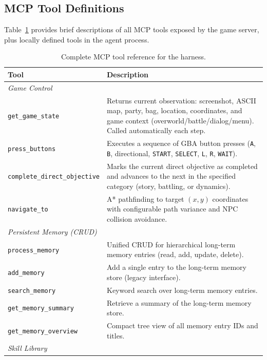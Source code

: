 \subsection{MCP Tool Definitions}\label{sec:appendix_tool_defs}

Table~\ref{tab:tool_defs} provides brief descriptions of all MCP tools exposed by the game server, plus locally defined tools in the agent process.

\begin{table}[h]
\centering
\caption{Complete MCP tool reference for the \pokeagent{} harness.}
\label{tab:tool_defs}
\small
\begin{tabular}{l p{9.5cm}}
\toprule
\textbf{Tool} & \textbf{Description} \\
\midrule
\multicolumn{2}{l}{\textit{Game Control}} \\
\texttt{get\_game\_state}        & Returns current observation: screenshot, ASCII map, party, bag, location, coordinates, and game context (overworld/battle/dialog/menu). Called automatically each step. \\
\texttt{press\_buttons}          & Executes a sequence of GBA button presses (\texttt{A}, \texttt{B}, directional, \texttt{START}, \texttt{SELECT}, \texttt{L}, \texttt{R}, \texttt{WAIT}). \\
\texttt{complete\_direct\_objective} & Marks the current direct objective as completed and advances to the next in the specified category (story, battling, or dynamics). \\
\texttt{navigate\_to}            & A* pathfinding to target $(x,y)$ coordinates with configurable path variance and NPC collision avoidance. \\
\midrule
\multicolumn{2}{l}{\textit{Persistent Memory (CRUD)}} \\
\texttt{process\_memory}         & Unified CRUD for hierarchical long-term memory entries (read, add, update, delete). \\
\texttt{add\_memory}             & Add a single entry to the long-term memory store (legacy interface). \\
\texttt{search\_memory}          & Keyword search over long-term memory entries. \\
\texttt{get\_memory\_summary}    & Retrieve a summary of the long-term memory store. \\
\texttt{get\_memory\_overview}   & Compact tree view of all memory entry IDs and titles. \\
\midrule
\multicolumn{2}{l}{\textit{Skill Library}} \\

\end{tabular}
\end{table}
